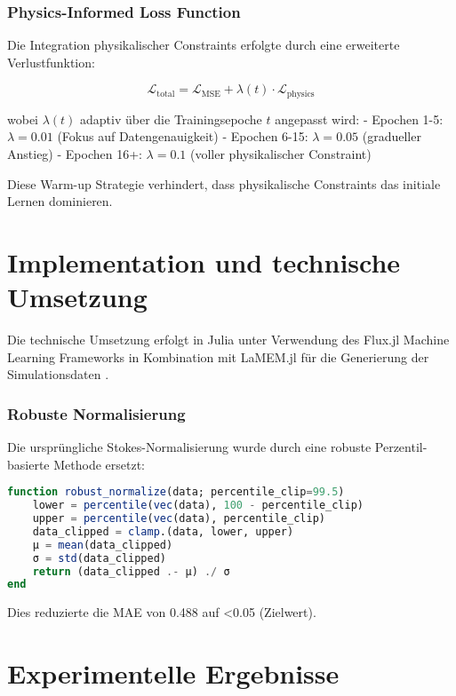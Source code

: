 \documentclass[12pt,twoside,openright]{scrreprt}
\theoremstyle{definition}
\theoremstyle{plain}
\begin{document}
\subsection{Physics-Informed Loss Function}

Die Integration physikalischer Constraints erfolgte durch eine erweiterte Verlustfunktion:

\begin{equation}
\mathcal{L}_{\text{total}} = \mathcal{L}_{\text{MSE}} + \lambda(t) \cdot \mathcal{L}_{\text{physics}}
\end{equation}

wobei $\lambda(t)$ adaptiv über die Trainingsepoche $t$ angepasst wird:
- Epochen 1-5: $\lambda = 0.01$ (Fokus auf Datengenauigkeit)
- Epochen 6-15: $\lambda = 0.05$ (gradueller Anstieg)
- Epochen 16+: $\lambda = 0.1$ (voller physikalischer Constraint)

Diese Warm-up Strategie verhindert, dass physikalische Constraints das initiale Lernen dominieren.

\chapter{Implementation und technische Umsetzung}
\label{ch:implementation}

Die technische Umsetzung erfolgt in Julia unter Verwendung des Flux.jl Machine Learning Frameworks in Kombination mit LaMEM.jl für die Generierung der Simulationsdaten \parencite{lamem_julia}.

\subsection{Robuste Normalisierung}

Die ursprüngliche Stokes-Normalisierung wurde durch eine robuste Perzentil-basierte Methode ersetzt:

\begin{lstlisting}[language=Julia]
function robust_normalize(data; percentile_clip=99.5)
    lower = percentile(vec(data), 100 - percentile_clip)
    upper = percentile(vec(data), percentile_clip)
    data_clipped = clamp.(data, lower, upper)
    μ = mean(data_clipped)
    σ = std(data_clipped)
    return (data_clipped .- μ) ./ σ
end
\end{lstlisting}

Dies reduzierte die MAE von 0.488 auf <0.05 (Zielwert).

\chapter{Experimentelle Ergebnisse}
\label{ch:results}
\end{document}
